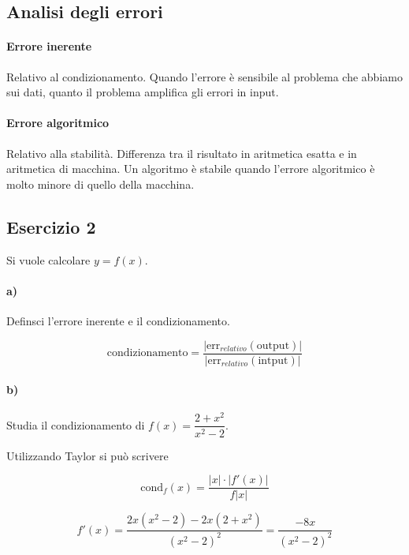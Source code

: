 \subsection*{Analisi degli errori}


\paragraph{Errore inerente} Relativo al condizionamento. Quando l'errore è sensibile al problema che abbiamo sui dati, quanto il problema amplifica gli errori in input.

\paragraph{Errore algoritmico} Relativo alla stabilità. Differenza tra il risultato in aritmetica esatta e in aritmetica di macchina. Un algoritmo è stabile quando l'errore algoritmico è molto minore di quello della macchina.


\subsection{Esercizio 2}

Si vuole calcolare $y=f(x)$.


\paragraph{a)} Definsci l'errore inerente e il condizionamento.

\begin{equation*}
  \mbox{condizionamento} = \dfrac{|\mbox{err}_{relativo}(\mbox{output})|}{|\mbox{err}_{relativo}(\mbox{intput})|}
\end{equation*}


\paragraph{b)} Studia il condizionamento di $f(x)=\dfrac{2+x^2}{x^2-2}$.\medskip

Utilizzando Taylor si può scrivere

\begin{equation*}
  \mbox{cond}_f (x) = \dfrac{|x|\cdot |f'(x)|}{f|x|}
\end{equation*}
  
\begin{equation*}
  f'(x) = \dfrac{2x(x^2-2)-2x(2+x^2)}{(x^2-2)^2} = \dfrac{-8x}{(x^2-2)^2}
\end{equation*}
  
